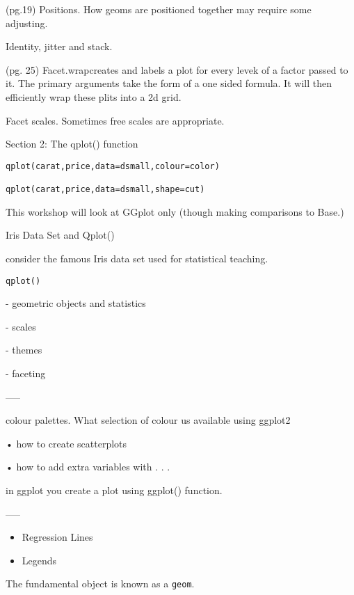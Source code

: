 (pg.19) Positions. How geoms are positioned together may require some adjusting.

Identity, jitter and stack.


(pg. 25) Facet.wrapcreates and labels a plot for every levek of a factor passed to it. The primary arguments take the form of a one sided formula. It will then efficiently wrap these plits into a 2d grid.

Facet scales. Sometimes free scales are appropriate.  

Section 2: The qplot() function








\begin{verbatim}        
qplot(carat,price,data=dsmall,colour=color)

qplot(carat,price,data=dsmall,shape=cut)
\end{verbatim}
 



This workshop will look at GGplot only (though making comparisons to Base.)

Iris Data Set and Qplot()


consider the famous Iris data set used for statistical teaching. 
\begin{verbatim} 
qplot()
\end{verbatim}

- geometric objects and statistics

- scales

- themes

- faceting

-----

colour palettes. What selection of colour us available using ggplot2


•
how to create scatterplots 

•
how to add extra variables with . . .



in ggplot you create a plot using ggplot() function.

-----
\begin{itemize}
\item Regression Lines
\item Legends
\end{itemize}

The fundamental object is known as a \texttt{geom}.



 



